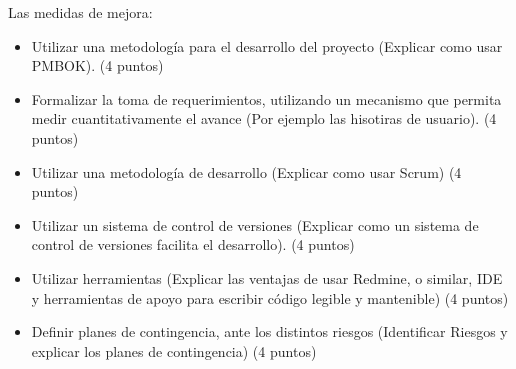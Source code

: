 \documentclass[10pt]{examdesign}
\begin{document}
\begin{shortanswer}[title={Pregunta de desarrollo}, rearrange=yes,resetcounter=yes]
\begin{question}
\begin{answer}
	    Las medidas de mejora:
	    \begin{itemize}
	     \item Utilizar una metodología para el desarrollo del proyecto (Explicar como usar PMBOK). (4 puntos)
	     \item Formalizar la toma de requerimientos, utilizando un mecanismo que permita medir cuantitativamente el avance (Por ejemplo las hisotiras de usuario). (4 puntos)
	     \item Utilizar una metodología de desarrollo (Explicar como usar Scrum) (4 puntos)
	     \item Utilizar un sistema de control de versiones (Explicar como un sistema de control de versiones facilita el desarrollo). (4 puntos)
	     \item Utilizar herramientas (Explicar las ventajas de usar Redmine, o similar, IDE y herramientas de apoyo para escribir código legible y mantenible) (4 puntos)
	     \item Definir planes de contingencia, ante los distintos riesgos (Identificar Riesgos y explicar los planes de contingencia) (4 puntos)
	    \end{itemize}


	\end{answer}
\end{question}

\end{shortanswer}
\end{document}
